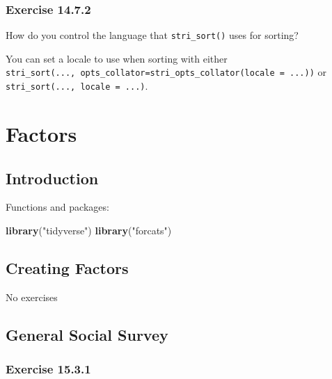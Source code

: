 \documentclass[]{book}
\newenvironment{Shaded}{\begin{snugshade}}{\end{snugshade}}
\newcommand{\KeywordTok}[1]{\textcolor[rgb]{0.13,0.29,0.53}{\textbf{#1}}}
\newcommand{\NormalTok}[1]{#1}
\newcommand{\StringTok}[1]{\textcolor[rgb]{0.31,0.60,0.02}{#1}}
\theoremstyle{plain}
\theoremstyle{remark}
\begin{document}
\hypertarget{exercise-14.7.2}{%
\subsection*{\texorpdfstring{Exercise
{14.7.2}}{Exercise 14.7.2}}\label{exercise-14.7.2}}

How do you control the language that \texttt{stri\_sort()} uses for
sorting?

You can set a locale to use when sorting with either
\texttt{stri\_sort(...,\ opts\_collator=stri\_opts\_collator(locale\ =\ ...))}
or \texttt{stri\_sort(...,\ locale\ =\ ...)}.

\hypertarget{factors}{%
\chapter{Factors}\label{factors}}

\hypertarget{introduction-10}{%
\section{Introduction}\label{introduction-10}}

Functions and packages:

\begin{Shaded}
\begin{Highlighting}[]
\KeywordTok{library}\NormalTok{(}\StringTok{"tidyverse"}\NormalTok{)}
\KeywordTok{library}\NormalTok{(}\StringTok{"forcats"}\NormalTok{)}
\end{Highlighting}
\end{Shaded}

\hypertarget{creating-factors}{%
\section{Creating Factors}\label{creating-factors}}

No exercises

\hypertarget{general-social-survey}{%
\section{General Social Survey}\label{general-social-survey}}

\hypertarget{exercise-15.3.1}{%
\subsection*{\texorpdfstring{Exercise
{15.3.1}}{Exercise 15.3.1}}\label{exercise-15.3.1}}
\end{document}
